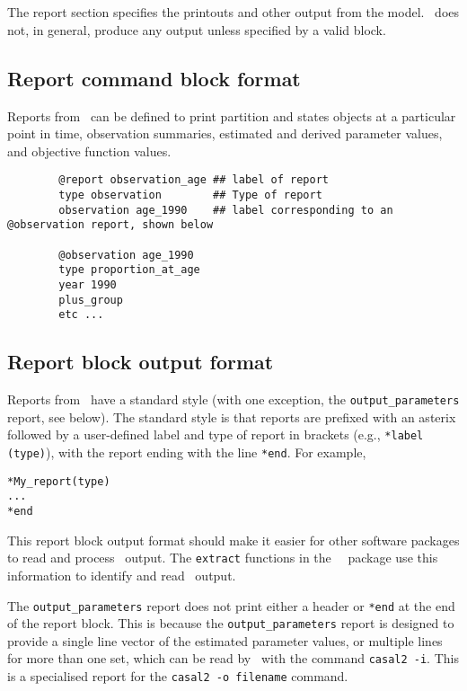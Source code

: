 \section{\label{sec:report-section}}

The report section specifies the printouts and other output from the model. \CNAME\ does not, in general, produce any output unless specified by a valid  block.

\subsection{Report command block format}

Reports from \CNAME\ can be defined to print partition and states objects at a particular point in time, observation summaries, estimated and derived parameter values, and objective function values.

\begin{verbatim}
		@report observation_age ## label of report
		type observation		## Type of report
		observation age_1990	## label corresponding to an @observation report, shown below

		@observation age_1990
		type proportion_at_age
		year 1990
		plus_group
		etc ...
\end{verbatim}

\subsection{Report block output format}

Reports from \CNAME\ have a standard style (with one exception, the \texttt{output\_parameters} report, see below). The standard style is that reports are prefixed with an asterix followed by a user-defined label and type of report in brackets (e.g., \texttt{*label (type)}), with the report ending with the line \texttt{*end}. For example,

\begin{verbatim}
*My_report(type)
...
*end
\end{verbatim}

This report block output format should make it easier for other software packages to read and process \CNAME\ output. The \texttt{extract} functions in the \R\ \CNAME\ package use this information to identify and read \CNAME\ output.

The \texttt{output\_parameters} report does not print either a header or \texttt{*end} at the end of the report block. This is because the \texttt{output\_parameters} report is designed to provide a single line vector of the estimated parameter values, or multiple lines for more than one set, which can be read by \CNAME\ with the command \texttt{casal2 -i}. This is a specialised report for the \texttt{casal2 -o filename} command.

